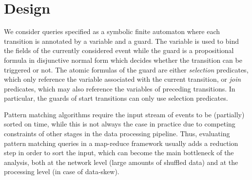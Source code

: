 \section{Design}
\label{sec:design}

We consider queries specified as a symbolic finite automaton where each
transition is annotated by a variable and a guard.
The variable is used to bind the fields of the currently considered event while 
the guard is a propositional formula in disjunctive normal form which decides 
whether the transition can be triggered or not.  
The atomic formulas of the guard are either {\em selection} predicates, which 
only reference the variable associated with the current transition,
or {\em join} predicates, which may also reference the variables of preceding 
transitions.
In particular, the guards of start transitions can only use selection 
predicates.  
   
Pattern matching algorithms require the input stream of events to be
(partially) sorted on time, while this is not always the case in practice due
to competing constraints of other stages in the data processing pipeline. 
Thus, evaluating pattern matching queries in a map-reduce framework usually 
adds a reduction step in order to sort the input, which can become the main 
bottleneck of the analysis, both at the network level (large amounts of 
shuffled data) and at the processing level (in case of data-skew).

